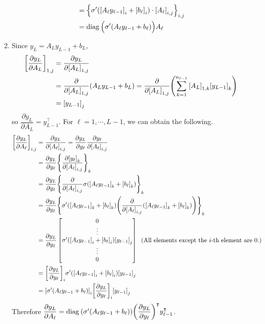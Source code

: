 \documentclass[10pt]{article}
\begin{document}
\begin{enumerate}[leftmargin=*, label=(\alph*)]
\begin{align*}
        &= \qty{\sigma'\qty(\qty[A_\ell y_{\ell-1}]_i + \qty[b_\ell]_i)\cdot\qty[A_\ell]_{i, j}}_{i, j} \\
        &= \text{diag}\:\Big(\sigma'\qty(A_\ell y_{\ell-1} + b_\ell)\Big) A_\ell
    \end{align*}
    \item Since $y_L = A_Ly_{L-1} + b_L$, 
    \begin{align*}
        \qty[\frac{\partial y_L}{\partial A_L}]_{1, j} &= \frac{\partial y_L}{\partial \qty[A_L]_{1, j}} \\
        &= \frac{\partial}{\partial \qty[A_L]_{1, j}}\qty(A_L y_{L-1} + b_L) = \frac{\partial}{\partial \qty[A_L]_{1, j}}\qty(\sum_{k=1}^{n_{\ell-1}}\qty[A_L]_{1,k}\qty[y_{L-1}]_k) \\
        &= \qty[y_{L-1}]_j
    \end{align*}
    so $\dfrac{\partial y_L}{\partial A_L} = y_{L-1}^\intercal$. For $\ell = 1, \cdots, L-1$, we can obtain the following.
    \begin{align*}
        \qty[\frac{\partial y_L}{\partial A_\ell}]_{i, j} &= \frac{\partial y_L}{\partial \qty[A_\ell]_{i, j}} = \frac{\partial y_L}{\partial y_\ell}\frac{\partial y_\ell}{\partial \qty[A_\ell]_{i, j}} \\
        &= \frac{\partial y_L}{\partial y_\ell}\qty{\frac{\partial\qty[y_\ell]_k}{\partial \qty[A_\ell]_{i, j}}}_{k} \\
        &= \frac{\partial y_L}{\partial y_\ell}\qty{\frac{\partial}{\partial \qty[A_\ell]_{i, j}}\sigma\qty(\qty[A_\ell y_{\ell-1}]_k + \qty[b_\ell]_k)}_{k} \\
        &= \frac{\partial y_L}{\partial y_\ell}\qty{\sigma'\qty(\qty[A_\ell y_{\ell-1}]_k + \qty[b_\ell]_k)\qty(\frac{\partial}{\partial \qty[A_\ell]_{i, j}}\qty(\qty[A_\ell y_{\ell-1}]_k + \qty[b_\ell]_k))}_{k} \\
        &= \frac{\partial y_L}{\partial y_\ell}\begin{bmatrix}
            0 \\ \vdots \\ {\sigma'\qty(\qty[A_\ell y_{\ell-1}]_i + \qty[b_\ell]_i)\qty[y_{\ell - 1}]_j} \\ \vdots \\ 0
        \end{bmatrix} \;\; (\text{All elements except the } i \text{-th element are }0.)\\
        &= \qty[\frac{\partial y_L}{\partial y_\ell}]_{i}\sigma'\qty(\qty[A_\ell y_{\ell-1}]_i + \qty[b_\ell]_i)\qty[y_{\ell - 1}]_j \\
        &= \qty[\sigma'\qty(A_\ell y_{\ell-1} + b_\ell)]_i\qty[\frac{\partial y_L}{\partial y_\ell}]_{i}\qty[y_{\ell - 1}]_j
    \end{align*}
    Therefore $\dfrac{\partial y_L}{\partial A_\ell} = \text{diag}\:\qty(\sigma'\qty(A_\ell y_{\ell-1} + b_\ell))\qty(\dfrac{\partial y_L}{\partial y_\ell})^\intercal y_{\ell-1}^\intercal$.

\end{enumerate}
\end{document}
